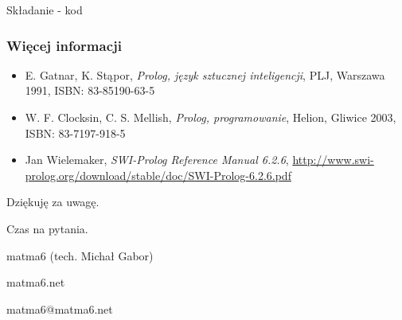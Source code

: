 \documentclass[blue]{beamer}
\begin{document}
\begin{frame}{Składanie - kod}

\end{frame}
\begin{frame}
\frametitle{Więcej informacji}
\begin{itemize}
\item E. Gatnar, K. Stąpor, \textit{Prolog, język sztucznej inteligencji}, PLJ, Warszawa 1991, ISBN: 83-85190-63-5
\item W. F. Clocksin, C. S. Mellish, \textit{Prolog, programowanie}, Helion, Gliwice 2003, ISBN: 83-7197-918-5
\item Jan Wielemaker, \textit{SWI-Prolog Reference Manual 6.2.6}, \url{http://www.swi-prolog.org/download/stable/doc/SWI-Prolog-6.2.6.pdf}
\end{itemize}
\end{frame}
\begin{frame}
\begin{center}
\begin{Huge}
Dziękuję za uwagę.

Czas na pytania.

matma6 (tech. Michał Gabor)

matma6.net

matma6@matma6.net

\end{Huge}
\end{center}
\end{frame}
\end{document}
